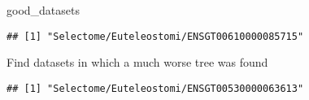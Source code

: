\documentclass[
]{article}
\newenvironment{Shaded}{\begin{snugshade}}{\end{snugshade}}
\newcommand{\DataTypeTok}[1]{\textcolor[rgb]{0.13,0.29,0.53}{#1}}
\newcommand{\DecValTok}[1]{\textcolor[rgb]{0.00,0.00,0.81}{#1}}
\newcommand{\KeywordTok}[1]{\textcolor[rgb]{0.13,0.29,0.53}{\textbf{#1}}}
\newcommand{\NormalTok}[1]{#1}
\newcommand{\OperatorTok}[1]{\textcolor[rgb]{0.81,0.36,0.00}{\textbf{#1}}}
\newcommand{\StringTok}[1]{\textcolor[rgb]{0.31,0.60,0.02}{#1}}
\begin{document}
\begin{Shaded}
\begin{Highlighting}[]
\NormalTok{good_datasets}
\end{Highlighting}
\end{Shaded}

\begin{verbatim}
## [1] "Selectome/Euteleostomi/ENSGT00610000085715"
\end{verbatim}

Find datasets in which a much worse tree was found

\begin{Shaded}
\end{Shaded}

\begin{verbatim}
## [1] "Selectome/Euteleostomi/ENSGT00530000063613"
\end{verbatim}

\begin{Shaded}
\end{Shaded}
\end{document}
